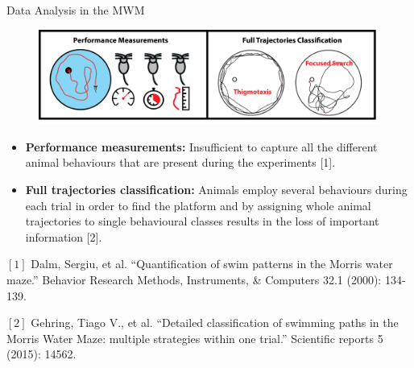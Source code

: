 \documentclass{beamer}
\newcounter{mycounter}
\newenvironment{noindlist}
{\begin{list}{}{\usecounter{mycounter} \labelsep=0em \labelwidth=0em \leftmargin=0em \itemindent=0em}}
	{\end{list}}
\begin{document}
{\begin{frame}{Data Analysis in the MWM}
	\begin{figure}[H]
		\centering
		\includegraphics[width=\textwidth]{figures/nutshell-comb}
	\end{figure}
	\vspace{-2mm}
	\begin{itemize}
		\item<2-> \textbf{Performance measurements:} Insufficient to capture all the different animal behaviours that are present during the experiments [1].
		\vspace{3mm}
		\item<3-> \textbf{Full trajectories classification:} Animals employ several behaviours during each trial in order to find the platform and by assigning whole animal trajectories to single behavioural classes results in the loss of important information [2].		
	\end{itemize}
	\vspace{1.3mm}
	\begin{tiny}
		\begin{noindlist}
			\item<2-> $[1]$ Dalm, Sergiu, et al. ``Quantification of swim patterns in the Morris water maze.'' Behavior Research Methods, Instruments, \& Computers 32.1 (2000): 134-139.
			\item<3-> $[2]$ Gehring, Tiago V., et al. ``Detailed classification of swimming paths in the Morris Water Maze: multiple strategies within one trial.'' Scientific reports 5 (2015): 14562.
		\end{noindlist}
	\end{tiny}
\end{frame}

}
\end{document}
